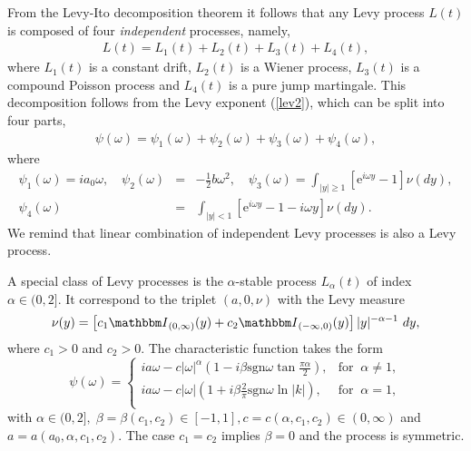 \documentclass[authoryear,draft,1p,times]{elsarticle}
\newcommand{\be}{\begin{equation}}
\newcommand{\ee}{\end{equation}}
\renewcommand{\=}{\stackrel{\mathrm{d}}{=}}
\begin{document}
From the Levy-Ito decomposition theorem it follows that any Levy process $L(t)$ is composed of four {\it independent}  processes, namely, 
%
\begin{eqnarray}  \label{fourL}
 L(t)=L_1(t) +L_2(t) + L_3(t) + L_4(t), 
\end{eqnarray}
%
where $L_1(t)$ is a constant drift, $L_2(t)$ is a Wiener process, $L_3(t)$ is a compound Poisson process and 
$L_4(t)$ is a pure jump martingale.   This decomposition  follows from the Levy exponent  (\ref{lev2}), 
which can be split into four parts, 
%
\begin{eqnarray}  \label{fourL}
\psi(\omega) = \psi_1(\omega)  +\psi_2(\omega) +\psi_3(\omega) +\psi_4(\omega),  
\end{eqnarray}
%
where
%
\begin{eqnarray}  \label{fourpsi}
 \psi_1(\omega)  = i a_0 \omega,  \quad
\psi_2(\omega) &=& -\frac{1}{2} b \omega^2, \quad 
\psi_3(\omega) = \int_{|y| \ge 1} \left[\mbox{e}^{i\omega y} - 1 \right]  \nu (dy), \nonumber\\  
 \psi_4(\omega) &=& \int_{|y| < 1} \left[\mbox{e}^{i\omega y} - 1 - i\omega y  \right]  \nu (dy).  
\end{eqnarray}
%
We remind that linear combination of independent Levy processes is also a Levy process. 

A special class of Levy processes  is  the $\alpha$-stable   process  $L_{\alpha}(t)$  of index $\alpha \in (0, 2]$. 
It correspond to the triplet $(a, 0, \nu)$ with the Levy measure  
%
\begin{eqnarray}  \label{lev5}
 \nu(y) = \left[ c_{1} {\mathbbm I}_{(0,\infty)}(y) + c_{2} {\mathbbm I}_{(-\infty,0)}(y)  
\right] |y|^{-\alpha -1}\ dy, 
\end{eqnarray}
%
where $c_1>0$ and  $c_2>0$. 
The characteristic function  takes the form 
\be
\psi(\omega) =
\left\{
\begin{array}{ll}
i a \omega  - c |\omega|^\alpha\left (1-i\beta\mbox{sgn}\omega \tan
\frac{\pi\alpha}{2} \right), & \mbox{for}\;\;\alpha\neq 1, \\
i a \omega  -c |\omega|\left (1+i\beta\frac{2}{\pi}\mbox{sgn} \omega \ln|k| \right), & \mbox{for}\;\;\alpha=1, \\
\end{array}
\right.
\label{ch1_charakt}
\ee
with $\alpha\in(0, 2], \; \beta =\beta(c_1, c_2) \in [-1, 1],  c = c(\alpha, c_1, c_2)  \in(0, \infty)$  and $a = a(a_0, \alpha, c_1, c_2)$.   The case  $c_1=c_2$  implies $\beta=0$ and the process is symmetric. 
\end{document}
